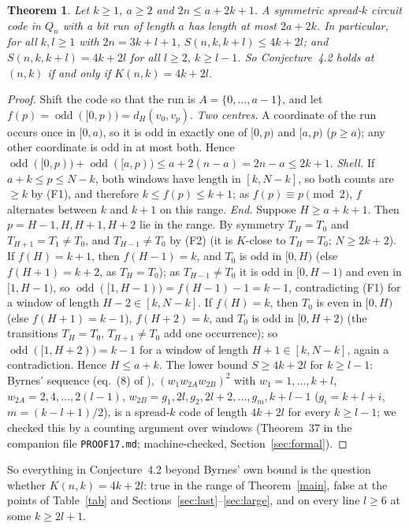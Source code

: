 \documentclass[11pt]{article}
\newtheorem{theorem}{Theorem}
\theoremstyle{remark}
\newcommand{\odd}{\operatorname{odd}}
\begin{document}
\begin{theorem}\label{symall}
Let $k\ge 1$, $a\ge 2$ and $2n\le a+2k+1$. A symmetric spread-$k$ circuit code in $Q_n$ with a bit run of length $a$ has length
at most $2a+2k$. In particular, for all $k,l\ge 1$ with $2n=3k+l+1$, $S(n,k,k+l)\le 4k+2l$; and $S(n,k,k+l)=4k+2l$ for all
$l\ge 2$, $k\ge l-1$. So Conjecture~4.2 holds at $(n,k)$ if and only if $K(n,k)=4k+2l$.
\end{theorem}
\begin{proof}
Shift the code so that the run is $A=\{0,\dots,a-1\}$, and let $f(p)=\odd([0,p))=d_H(v_0,v_p)$.
\emph{Two centres.} A coordinate of the run occurs once in $[0,a)$, so it is odd in exactly one of $[0,p)$ and $[a,p)$ ($p\ge a$);
any other coordinate is odd in at most both. Hence $\odd([0,p))+\odd([a,p))\le a+2(n-a)=2n-a\le 2k+1$.
\emph{Shell.} If $a+k\le p\le N-k$, both windows have length in $[k,N-k]$, so both counts are $\ge k$ by (F1), and therefore
$k\le f(p)\le k+1$; as $f(p)\equiv p\pmod 2$, $f$ alternates between $k$ and $k+1$ on this range.
\emph{End.} Suppose $H\ge a+k+1$. Then $p=H-1,H,H+1,H+2$ lie in the range. By symmetry $T_H=T_0$ and $T_{H+1}=T_1\ne T_0$,
and $T_{H-1}\ne T_0$ by (F2) (it is $K$-close to $T_H=T_0$; $N\ge 2k+2$).
If $f(H)=k+1$, then $f(H-1)=k$, and $T_0$ is odd in $[0,H)$ (else $f(H+1)=k+2$, as $T_H=T_0$); as $T_{H-1}\neq T_0$ it is odd in
$[0,H-1)$ and even in $[1,H-1)$, so $\odd([1,H-1))=f(H-1)-1=k-1$, contradicting (F1) for a window of length $H-2\in[k,N-k]$.
If $f(H)=k$, then $T_0$ is even in $[0,H)$ (else $f(H+1)=k-1$), $f(H+2)=k$, and $T_0$ is odd in $[0,H+2)$ (the transitions
$T_H=T_0$, $T_{H+1}\ne T_0$ add one occurrence); so $\odd([1,H+2))=k-1$ for a window of length $H+1\in[k,N-k]$, again a
contradiction. Hence $H\le a+k$. The lower bound $S\ge 4k+2l$ for $k\ge l-1$: Byrnes' sequence (eq.~(8) of \cite{B2}),
$(w_1w_{2A}w_{2B})^2$ with $w_1=1,\dots,k+l$, $w_{2A}=2,4,\dots,2(l-1)$, $w_{2B}=g_1,2l,g_2,2l+2,\dots,g_m,k+l-1$
($g_i=k+l+i$, $m=(k-l+1)/2$), is a spread-$k$ code of length $4k+2l$ for every $k\ge l-1$; we checked this by a counting
argument over windows (Theorem~37 in the companion file \texttt{PROOF17.md}; machine-checked, Section~\ref{sec:formal}).
\end{proof}

So everything in Conjecture~4.2 beyond Byrnes' own bound is the question whether $K(n,k)=4k+2l$: true in the range of
Theorem~\ref{main}, false at the points of Table~\ref{tab} and Sections~\ref{sec:last}--\ref{sec:large}, and on every line $l\ge 6$
at some $k\ge 2l+1$.
\end{document}
